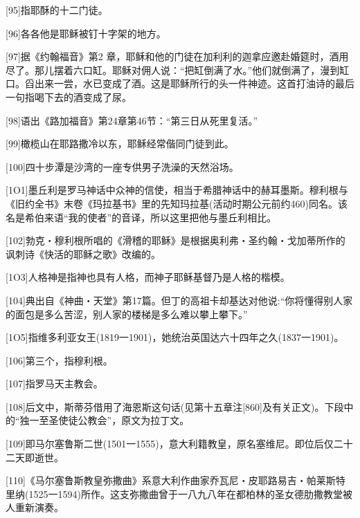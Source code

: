 \documentclass{article}
\begin{document}
[95]指耶酥的十二门徒。



[96]各各他是耶稣被钉十字架的地方。



[97]据《约翰福音》第2 章，耶稣和他的门徒在加利利的迦拿应邀赴婚筵时，酒用尽了。那儿摆着六口缸。耶稣对佣人说：“把缸倒满了水。”他们就倒满了，漫到缸口。舀出来一尝，水已变成了酒。这是耶稣所行的头一件神迹。这首打油诗的最后一句指喝下去的酒变成了尿。



[98]语出《路加福音》第24章第46节：“第三日从死里复活。”



[99]橄榄山在耶路撒冷以东，耶稣经常偕同门徒到此。



[100]四十步潭是沙湾的一座专供男子洗澡的天然浴场。



[1O1]墨丘利是罗马神话中众神的信使，相当于希腊神话中的赫耳墨斯。穆利根与《旧约全书》末卷《玛拉基书》里的先知玛拉基(活动时期公元前约460)同名。该名是希伯来语“我的使者”的音译，所以这里把他与墨丘利相比。



[102]勃克・穆利根所唱的《滑稽的耶稣》是根据奥利弗・圣约翰・戈加蒂所作的讽刺诗《快活的耶稣之歌》改编的。



[1O3]人格神是指神也具有人格，而神子耶稣基督乃是人格的楷模。



[104]典出自《神曲・天堂》第17篇。但丁的高祖卡却基达对他说:“你将懂得别人家的面包是多么苦涩，别人家的楼梯是多么难以攀上攀下。”



[1O5]指维多利亚女王(1819一1901)，她统治英国达六十四年之久(1837一1901)。



[106]第三个，指穆利根。



[107]指罗马天主教会。



[108]后文中，斯蒂芬借用了海恩斯这句话(见第十五章注[860]及有关正文)。下段中的“独一至圣使徒公教会”，原文为拉丁文。



[109]即马尔塞鲁斯二世(1501一1555)，意大利籍教皇，原名塞维尼。即位后仅二十二天即逝世。



[110]《马尔塞鲁斯教皇弥撒曲》系意大利作曲家乔瓦尼・皮耶路易吉・帕莱斯特里纳(1525一1594)所作。这支弥撒曲曾于一八九八年在都柏林的圣女德肋撒教堂被人重新演奏。
\end{document}
